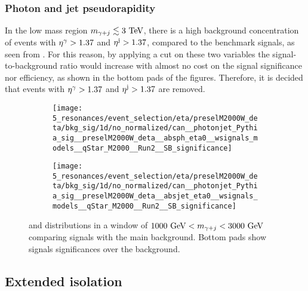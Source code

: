 \subsubsection{Photon and jet pseudorapidity}
\label{subsubsec:evt_selection:sr_opt:eta:etas}

In the low mass region \(m_{\gamma+j} \lesssim 3~\text{TeV}\), there is a high background concentration of events with \(\eta^{\gamma} > 1.37\) and \(\eta^{\text{j}} > 1.37\), compared to the benchmark signals, as seen from \Fig{\ref{fig:evt_selection:sr_opt:eta:etas:1d}}. For this reason, by applying a cut on these two variables the signal-to-background ratio would increase with almost no cost on the signal significance nor efficiency, as shown in the bottom pads of the figures. Therefore, it is decided that events with \(\eta^{\gamma} > 1.37\) and \(\eta^{\text{j}} > 1.37\) are removed.

\begin{figure}[ht!]
    \centering
    \begin{subfigure}[h]{0.49\linewidth}
        \centering
        \texttt{[image: 5\_resonances/event\_selection/eta/preselM2000W\_deta/bkg\_sig/1d/no\_normalized/can\_\_photonjet\_Pythia\_sig\_\_preselM2000W\_deta\_\_absph\_eta0\_\_wsignals\_models\_\_qStar\_M2000\_\_Run2\_\_SB\_significance]}
        \caption{\etagam}
        \label{fig:evt_selection:sr_opt:eta:etas:1d:ph}
    \end{subfigure}
    \hfill
    \begin{subfigure}[h]{0.49\linewidth}
        \centering
        \texttt{[image: 5\_resonances/event\_selection/eta/preselM2000W\_deta/bkg\_sig/1d/no\_normalized/can\_\_photonjet\_Pythia\_sig\_\_preselM2000W\_deta\_\_absjet\_eta0\_\_wsignals\_models\_\_qStar\_M2000\_\_Run2\_\_SB\_significance]}
        \caption{\etajet}
        \label{fig:evt_selection:sr_opt:eta:etas:1d:jet}
    \end{subfigure}
    \caption{\etagam and \etajet distributions in a window of \(1000~\text{GeV} < m_{\gamma+j} < 3000~\text{GeV}\) comparing signals with the main \yj \pythia background. Bottom pads show signals significances over the background.}
    \label{fig:evt_selection:sr_opt:eta:etas:1d}
\end{figure}



\subsection{Extended isolation}
\label{subsec:evt_selection:sr_opt:extended_iso}

